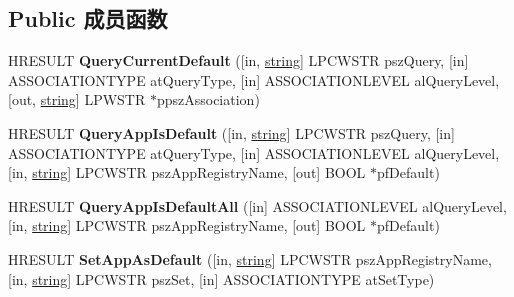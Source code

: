 \subsection*{Public 成员函数}
\begin{DoxyCompactItemize}
\item 
\mbox{\label{interface_i_application_association_registration_a9ffc8a0ee79af78aa6f2b5d8a488a342}} 
H\+R\+E\+S\+U\+LT {\bfseries Query\+Current\+Default} (\mbox{[}in, \hyperlink{structstring}{string}\mbox{]} L\+P\+C\+W\+S\+TR psz\+Query, \mbox{[}in\mbox{]} A\+S\+S\+O\+C\+I\+A\+T\+I\+O\+N\+T\+Y\+PE at\+Query\+Type, \mbox{[}in\mbox{]} A\+S\+S\+O\+C\+I\+A\+T\+I\+O\+N\+L\+E\+V\+EL al\+Query\+Level, \mbox{[}out, \hyperlink{structstring}{string}\mbox{]} L\+P\+W\+S\+TR $\ast$ppsz\+Association)
\item 
\mbox{\label{interface_i_application_association_registration_aaac50ec48a2787f8b7f47621588c9e08}} 
H\+R\+E\+S\+U\+LT {\bfseries Query\+App\+Is\+Default} (\mbox{[}in, \hyperlink{structstring}{string}\mbox{]} L\+P\+C\+W\+S\+TR psz\+Query, \mbox{[}in\mbox{]} A\+S\+S\+O\+C\+I\+A\+T\+I\+O\+N\+T\+Y\+PE at\+Query\+Type, \mbox{[}in\mbox{]} A\+S\+S\+O\+C\+I\+A\+T\+I\+O\+N\+L\+E\+V\+EL al\+Query\+Level, \mbox{[}in, \hyperlink{structstring}{string}\mbox{]} L\+P\+C\+W\+S\+TR psz\+App\+Registry\+Name, \mbox{[}out\mbox{]} B\+O\+OL $\ast$pf\+Default)
\item 
\mbox{\label{interface_i_application_association_registration_af133678d997aef12fd5bfebe473fcd46}} 
H\+R\+E\+S\+U\+LT {\bfseries Query\+App\+Is\+Default\+All} (\mbox{[}in\mbox{]} A\+S\+S\+O\+C\+I\+A\+T\+I\+O\+N\+L\+E\+V\+EL al\+Query\+Level, \mbox{[}in, \hyperlink{structstring}{string}\mbox{]} L\+P\+C\+W\+S\+TR psz\+App\+Registry\+Name, \mbox{[}out\mbox{]} B\+O\+OL $\ast$pf\+Default)
\item 
\mbox{\label{interface_i_application_association_registration_aaba0315fb921f859ad7837e6bd68b083}} 
H\+R\+E\+S\+U\+LT {\bfseries Set\+App\+As\+Default} (\mbox{[}in, \hyperlink{structstring}{string}\mbox{]} L\+P\+C\+W\+S\+TR psz\+App\+Registry\+Name, \mbox{[}in, \hyperlink{structstring}{string}\mbox{]} L\+P\+C\+W\+S\+TR psz\+Set, \mbox{[}in\mbox{]} A\+S\+S\+O\+C\+I\+A\+T\+I\+O\+N\+T\+Y\+PE at\+Set\+Type)

\end{DoxyCompactItemize}

